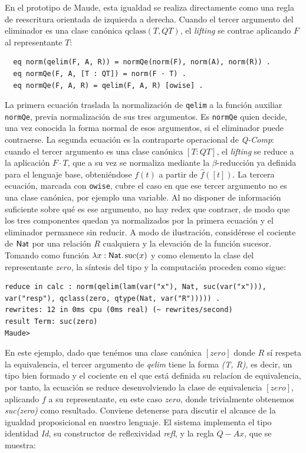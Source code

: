 En el prototipo de Maude, esta igualdad se realiza directamente como una regla de reescritura orientada de izquierda a derecha. Cuando el tercer argumento del eliminador es una clase can\'onica $\mathrm{qclass}(T, QT)$, el \textit{lifting} se contrae aplicando $F$ al representante $T$:

\begin{lstlisting}
  eq norm(qelim(F, A, R)) = normQe(norm(F), norm(A), norm(R)) .
  eq normQe(F, A, [T : QT]) = norm(F · T) .
  eq normQe(F, A, R) = qelim(F, A, R) [owise] .
\end{lstlisting}

La primera ecuación traslada la normalización de \texttt{qelim} a la función auxiliar \texttt{normQe}, previa normalización de sus tres argumentos. Es \texttt{normQe} quien decide, una vez conocida la forma normal de esos argumentos, si el eliminador puede contraerse. La segunda ecuación es la contraparte operacional de \textit{Q-Comp}: cuando el tercer argumento es una clase canónica $[T : QT]$, el \textit{lifting} se reduce a la aplicación $F \cdot T$, que a su vez se normaliza mediante la $\beta$-reducción ya definida para el lenguaje base, obteniéndose $f(t)$ a partir de $\hat{f}([t])$. La tercera ecuación, marcada con \texttt{owise}, cubre el caso en que ese tercer argumento no es una clase canónica, por ejemplo una variable. Al no disponer de información suficiente sobre qué es ese argumento, no hay redex que contraer, de modo que los tres componentes quedan ya normalizados por la primera ecuación y el eliminador permanece sin reducir.
\newline
\newline
\indent A modo de ilustración, considérese el cociente de $\mathsf{Nat}$ por una relación $R$ cualquiera y la elevación de la función sucesor. Tomando como función $\lambda x : \mathsf{Nat}.\, \mathrm{suc}(x)$ y como elemento la clase del representante $zero$, la síntesis del tipo y la computación proceden como sigue:

\begin{lstlisting}
reduce in calc : norm(qelim(lam(var("x"), Nat, suc(var("x"))), var("resp"), qclass(zero, qtype(Nat, var("R"))))) .
rewrites: 12 in 0ms cpu (0ms real) (~ rewrites/second)
result Term: suc(zero)
Maude>
\end{lstlisting}
\newline
\newline
\indent En este ejemplo, dado que tenémos una clase canónica $[zero]$ donde $R$ sí respeta la equivalencia, el tercer argumento de \textit{qelim} tiene la forma \textit{(T, R)}, es decir, un tipo bien formado y el cociente en el que está definida su relacíon de equivalencia, por tanto, la ecuación se reduce desenvolviendo la clase de equivalencia $[zero]$, aplicando $f$ a su representante, en este caso $zero$, donde trivialmente obtenemos \textit{suc(zero)} como resultado.
\newline
\newline
Conviene detenerse para discutir el alcance de la igualdad proposicional en nuestro lenguaje. El sistema implementa el tipo identidad \textit{Id}, su constructor de reflexividad \textit{refl}, y la regla $Q-Ax$, que se muestra:


